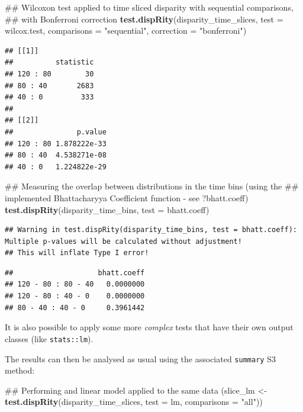 \documentclass[]{book}
\newenvironment{Shaded}{\begin{snugshade}}{\end{snugshade}}
\newcommand{\KeywordTok}[1]{\textcolor[rgb]{0.13,0.29,0.53}{\textbf{#1}}}
\newcommand{\DataTypeTok}[1]{\textcolor[rgb]{0.13,0.29,0.53}{#1}}
\newcommand{\StringTok}[1]{\textcolor[rgb]{0.31,0.60,0.02}{#1}}
\newcommand{\NormalTok}[1]{#1}
\theoremstyle{definition}
\theoremstyle{definition}
\theoremstyle{remark}
\begin{document}
\begin{Shaded}
\begin{Highlighting}[]
\NormalTok{## Wilcoxon test applied to time sliced disparity with sequential comparisons,}
\NormalTok{## with Bonferroni correction}
\KeywordTok{test.dispRity}\NormalTok{(disparity_time_slices, }\DataTypeTok{test =}\NormalTok{ wilcox.test,}
              \DataTypeTok{comparisons =} \StringTok{"sequential"}\NormalTok{, }\DataTypeTok{correction =} \StringTok{"bonferroni"}\NormalTok{)}
\end{Highlighting}
\end{Shaded}

\begin{verbatim}
## [[1]]
##          statistic
## 120 : 80        30
## 80 : 40       2683
## 40 : 0         333
## 
## [[2]]
##               p.value
## 120 : 80 1.878222e-33
## 80 : 40  4.538271e-08
## 40 : 0   1.224822e-29
\end{verbatim}

\begin{Shaded}
\begin{Highlighting}[]
\NormalTok{## Measuring the overlap between distributions in the time bins (using the}
\NormalTok{## implemented Bhattacharyya Coefficient function - see ?bhatt.coeff)}
\KeywordTok{test.dispRity}\NormalTok{(disparity_time_bins, }\DataTypeTok{test =}\NormalTok{ bhatt.coeff)}
\end{Highlighting}
\end{Shaded}

\begin{verbatim}
## Warning in test.dispRity(disparity_time_bins, test = bhatt.coeff): Multiple p-values will be calculated without adjustment!
## This will inflate Type I error!
\end{verbatim}

\begin{verbatim}
##                    bhatt.coeff
## 120 - 80 : 80 - 40   0.0000000
## 120 - 80 : 40 - 0    0.0000000
## 80 - 40 : 40 - 0     0.3961442
\end{verbatim}

It is also possible to apply some more \emph{complex} tests that have
their own output classes (like \texttt{stats::lm}).

The results can then be analysed as usual using the associated
\texttt{summary} S3 method:

\begin{Shaded}
\begin{Highlighting}[]
\NormalTok{## Performing and linear model applied to the same data}
\NormalTok{(slice_lm <-}\StringTok{ }\KeywordTok{test.dispRity}\NormalTok{(disparity_time_slices, }\DataTypeTok{test =}\NormalTok{ lm,}
                            \DataTypeTok{comparisons =} \StringTok{"all"}\NormalTok{))}
\end{Highlighting}
\end{Shaded}
\end{document}
